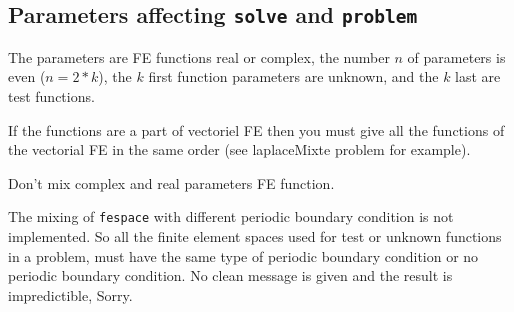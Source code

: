 \documentclass[a4paper,twoside,12pt]{book}
\begin{document}
\subsection{Parameters affecting \texttt{solve} and \texttt{problem}}
\label{def problem}
The parameters are FE functions real or complex, the number $n$ of parameters is even
($n=2*k$), the $k$ first function parameters are unknown, and the $k$
last are test functions.

\begin{note} If the functions are a part of
vectoriel FE then you must give  all the functions of the vectorial
FE in the same order (see laplaceMixte problem for example).
\end{note}
\begin{note} Don't mix  complex and real parameters  FE function. %
\end{note}
\begin{bug}
The mixing of \texttt{fespace} with different periodic boundary condition is not
implemented. So all the finite element spaces used for test or unknown functions
in a problem, must  have the same  type of periodic boundary condition or
no periodic boundary condition.
No clean message is given and the result is
impredictible, Sorry.
\end{bug}

\end{document}
